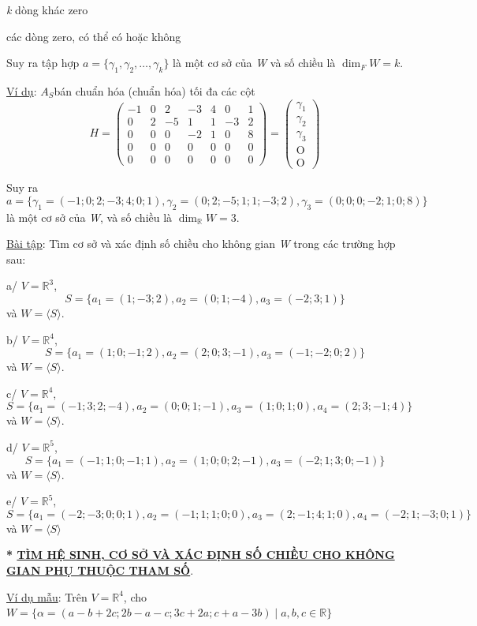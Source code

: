 \documentclass[12pt,a4paper]{article}
\newcommand{\ul}[1]{\uline{#1}}
\begin{document}
\emph{k} dòng khác zero

các dòng zero, có thể có hoặc không

Suy ra tập hợp $a = \{\gamma_1, \gamma_2, \dots, \gamma_k\}$ là một
cơ sở của \emph{W} và số chiều là
$\dim_F W = k$.

\ul{Ví dụ}: $A_S$bán chuẩn
hóa (chuẩn hóa) tối đa các cột
\[H = \begin{pmatrix} -1 & 0 & 2 & -3 & 4 & 0 & 1 \\ 0 & 2 & -5 & 1 & 1 & -3 & 2 \\ 0 & 0 & 0 & -2 & 1 & 0 & 8 \\ 0 & 0 & 0 & 0 & 0 & 0 & 0 \\ 0 & 0 & 0 & 0 & 0 & 0 & 0 \end{pmatrix} = \begin{pmatrix} \gamma_1 \\ \gamma_2 \\ \gamma_3 \\ \text{O} \\ \text{O} \end{pmatrix}\]

Suy ra
\[ a = \{\gamma_1 = (-1; 0; 2; -3; 4; 0; 1), \gamma_2 = (0; 2; -5; 1; 1; -3; 2), \gamma_3 = (0; 0; 0; -2; 1; 0; 8)\} \]
là một cơ sở
của \emph{W}, và số chiều là
$\dim_{\mathbb{R}} W = 3$.

\ul{Bài tập}: Tìm cơ sở và xác định số chiều cho không gian \emph{W}
trong các trường hợp sau:

a/ $V = \mathbb{R}^3$,
\[ S = \{a_1 = (1; -3; 2), a_2 = (0; 1; -4), a_3 = (-2; 3; 1)\} \]
và
$W = \langle S \rangle$.

b/ $V = \mathbb{R}^4$,
\[ S = \{a_1 = (1; 0; -1; 2), a_2 = (2; 0; 3; -1), a_3 = (-1; -2; 0; 2)\} \]
và
$W = \langle S \rangle$.

c/ $V = \mathbb{R}^4$,
\[ S = \{a_1 = (-1; 3; 2; -4), a_2 = (0; 0; 1; -1), a_3 = (1; 0; 1; 0), a_4 = (2; 3; -1; 4)\} \]
và
$W = \langle S \rangle$.

d/ $V = \mathbb{R}^5$,
\[ S = \{a_1 = (-1; 1; 0; -1; 1), a_2 = (1; 0; 0; 2; -1), a_3 = (-2; 1; 3; 0; -1)\} \]
và
$W = \langle S \rangle$.

e/ $V = \mathbb{R}^5$,
\[ S = \{a_1 = (-2; -3; 0; 0; 1), a_2 = (-1; 1; 1; 0; 0), a_3 = (2; -1; 4; 1; 0), a_4 = (-2; 1; -3; 0; 1)\} \]
và
$W = \langle S \rangle$

\textbf{* \ul{TÌM HỆ SINH, CƠ SỞ VÀ XÁC ĐỊNH SỐ CHIỀU CHO KHÔNG GIAN PHỤ
THUỘC THAM SỐ}}.

\ul{Ví dụ mẫu}: Trên $V = \mathbb{R}^4$,
cho $W = \{\alpha = (a - b + 2c; 2b - a - c; 3c + 2a; c + a - 3b) \mid a, b, c \in \mathbb{R}\}$
\end{document}
